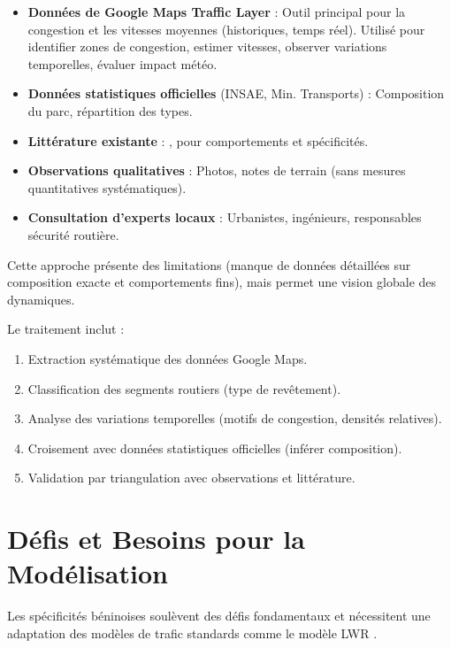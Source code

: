 \begin{itemize}
    \item \textbf{Données de Google Maps Traffic Layer} : Outil principal pour la congestion et les vitesses moyennes (historiques, temps réel). Utilisé pour identifier zones de congestion, estimer vitesses, observer variations temporelles, évaluer impact météo.
    \item \textbf{Données statistiques officielles} (INSAE, Min. Transports) : Composition du parc, répartition des types.
    \item \textbf{Littérature existante} : \cite{loggoh2019traffic}, \cite{aerc2019taxi} pour comportements et spécificités.
    \item \textbf{Observations qualitatives} : Photos, notes de terrain (sans mesures quantitatives systématiques).
    \item \textbf{Consultation d'experts locaux} : Urbanistes, ingénieurs, responsables sécurité routière.
\end{itemize}

\begin{remark}
Cette approche présente des limitations (manque de données détaillées sur composition exacte et comportements fins), mais permet une vision globale des dynamiques.
\end{remark}

Le traitement inclut :
\begin{enumerate}
    \item Extraction systématique des données Google Maps.
    \item Classification des segments routiers (type de revêtement).
    \item Analyse des variations temporelles (motifs de congestion, densités relatives).
    \item Croisement avec données statistiques officielles (inférer composition).
    \item Validation par triangulation avec observations et littérature.
\end{enumerate}

\section{Défis et Besoins pour la Modélisation}
\label{sec:defis_modelisation}

Les spécificités béninoises soulèvent des défis fondamentaux et nécessitent une adaptation des modèles de trafic standards comme le modèle LWR \cite{lighthill1955kinematic, richards1956shock}.


